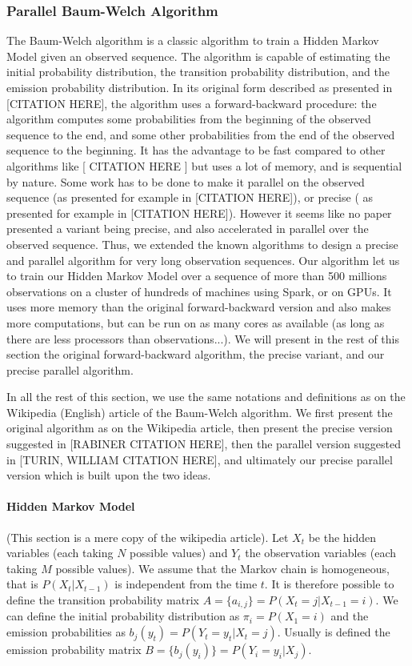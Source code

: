 \subsubsection{Parallel Baum-Welch Algorithm}
The Baum-Welch algorithm is a classic algorithm to train a Hidden Markov Model given an observed sequence. The algorithm is capable of estimating the initial probability distribution, the transition probability distribution, and the emission probability distribution.
In its original form described as presented in [CITATION HERE], the algorithm uses a forward-backward procedure: the algorithm computes some probabilities from the beginning of the observed sequence to the end, and some other probabilities from the end of the observed sequence to the beginning. It has the advantage to be fast compared to other algorithms like [ CITATION HERE ] but uses a lot of memory, and is sequential by nature.
Some work has to be done to make it parallel on the observed sequence (as presented for example in [CITATION HERE]), or precise ( as presented for example in [CITATION HERE]). However it seems like no paper presented a variant being precise, and also accelerated in parallel over the observed sequence.
Thus, we extended the known algorithms to design a precise and parallel algorithm for very long observation sequences.
Our algorithm let us to train our Hidden Markov Model over a sequence of more than 500 millions observations on a cluster of hundreds of machines using Spark, or on GPUs. It uses more memory than the original forward-backward version and also makes more computations, but can be run on as many cores as available (as long as there are less processors than observations...).
We will present in the rest of this section the original forward-backward algorithm, the precise variant, and our precise parallel algorithm.

In all the rest of this section, we use the same notations and definitions as on the Wikipedia (English) article of the Baum-Welch algorithm. We first present the original algorithm as on the Wikipedia article, then present the precise version suggested in [RABINER CITATION HERE], then the parallel version suggested in [TURIN, WILLIAM CITATION HERE], and ultimately our precise parallel version which is built upon the two ideas.

\paragraph{Hidden Markov Model}
(This section is a mere copy of the wikipedia article).
Let $X_t$ be the hidden variables (each taking $N$ possible values) and $Y_t$ the observation variables (each taking $M$ possible values). We assume that the Markov chain is homogeneous, that is $P(X_t|X_{t-1})$ is independent from the time $t$.
It is therefore possible to define the transition probability matrix $A = \{a_{i,j}\} = P(X_t = j | X_{t-1} = i)$.
We can define the initial probability distribution as $\pi_i = P(X_1=i)$ and the emission probabilities as $b_j(y_t) = P(Y_t = y_t | X_t = j)$. Usually is defined the emission probability matrix $B = \{b_j(y_i)\} = P(Y_i=y_i | X_j)$.

